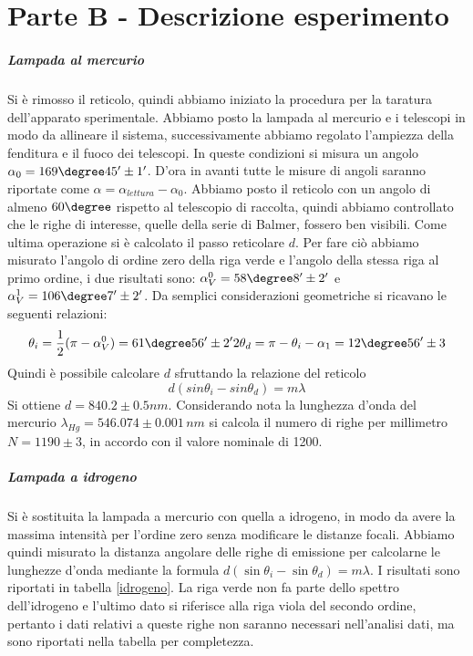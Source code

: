 \documentclass[10pt,a4paper]{article}
\begin{document}
\begin{table}[!htb]
\section{Parte B - Descrizione esperimento}
\subparagraph{Lampada al mercurio}
Si è rimosso il reticolo, quindi abbiamo iniziato la procedura per la taratura dell'apparato sperimentale. Abbiamo posto la lampada al mercurio e i telescopi in modo da allineare il sistema, successivamente abbiamo regolato l'ampiezza della fenditura e il fuoco dei telescopi. In queste condizioni si misura un angolo $\alpha_0 = 169 \degree 45 '\pm 1'$. D'ora in avanti tutte le misure di angoli saranno riportate come $\alpha=\alpha_{lettura}-\alpha_0$. Abbiamo posto il reticolo con un angolo di almeno $60\degree$ rispetto al telescopio di raccolta, quindi abbiamo controllato che le righe di interesse, quelle della serie di Balmer, fossero ben visibili.
Come ultima operazione si è calcolato il passo reticolare $d$. Per fare ciò abbiamo misurato l'angolo di ordine zero della riga verde e l'angolo della stessa riga al primo ordine, i due risultati sono: $\alpha_V^{0} = 58 \degree 8 ' \pm 2'$ e $\alpha_V^{1} = 106 \degree 7' \pm 2'$. Da semplici considerazioni geometriche si ricavano le seguenti relazioni:
\begin{equation}
\theta_i=\frac{1}{2}(\pi-\alpha_V^{0})=61\degree 56'\pm2' {2}
\theta_d=\pi-\theta_i-\alpha_1= 12 \degree 56' \pm 3
\end{equation}
Quindi è possibile calcolare $d$ sfruttando la relazione del reticolo 
\begin{equation}
d(sin{\theta_i}-sin{\theta_d})=m\lambda
\end{equation}
Si ottiene $d = 840.2 \pm 0.5 nm$. Considerando nota la lunghezza d'onda del mercurio $\lambda_{Hg}=546.074\pm0.001\,nm$ si calcola il numero di righe per millimetro $N = 1190 \pm 3$, in accordo con il valore nominale di 1200.

\subparagraph{Lampada a idrogeno}
Si è sostituita la lampada a mercurio con quella a idrogeno, in modo da avere la massima intensità per l'ordine zero senza modificare le distanze focali. Abbiamo quindi misurato la distanza angolare delle righe di emissione per calcolarne le lunghezze d'onda mediante la formula $d(\sin{\theta_i}-\sin{\theta_d})=m\lambda$. I risultati sono riportati in tabella \ref{idrogeno}. La riga verde non fa parte dello spettro dell'idrogeno e l'ultimo dato si riferisce alla riga viola del secondo ordine, pertanto i dati relativi a queste righe non saranno necessari nell'analisi dati, ma sono riportati nella tabella per completezza.\\


\end{table}
\end{document}

